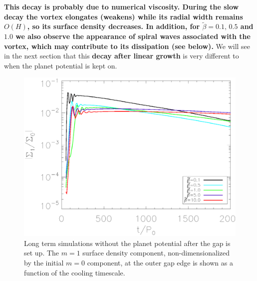{\bf This decay is probably due to numerical viscosity. During the
  slow decay the vortex elongates (weakens) while its radial width
  remains $O(H)$, so its surface density decreases. In addition, for 
  $\tilde{\beta}=0.1,\,0.5$ and $1.0$ we also observe the appearance of
  spiral waves associated with the vortex, which may contribute to
  its dissipation (see below).} 
We will see in the
next section that this {\bf decay after linear growth} is very
different to when the planet potential is kept on. 



\begin{figure}
  \includegraphics[width=\linewidth,clip=true,trim=0.5cm
  0cm 0cm 1.1cm]{figures/longterm_planetoff}
  \caption{Long term simulations without the planet potential after
    the gap is set up. The $m=1$ surface density component,
    non-dimensionalized by the initial $m=0$ component, at the
    outer gap edge is shown as a function of the cooling timescale. 
  } \label{planetofflifetimeplot}
\end{figure}


